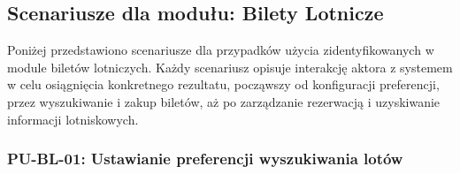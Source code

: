 \documentclass[a4paper,12pt]{article}
\begin{document}
\subsection{Scenariusze dla modułu: Bilety Lotnicze}
Poniżej przedstawiono scenariusze dla przypadków użycia zidentyfikowanych w module biletów lotniczych. Każdy scenariusz opisuje interakcję aktora z systemem w celu osiągnięcia konkretnego rezultatu, począwszy od konfiguracji preferencji, przez wyszukiwanie i zakup biletów, aż po zarządzanie rezerwacją i uzyskiwanie informacji lotniskowych.

\subsubsection{PU-BL-01: Ustawianie preferencji wyszukiwania lotów}

\begingroup %
\small %
\renewcommand{\arraystretch}{1.2} %

\newlength{\pierwszakolumnaszerokoscPUBKUstPref}
\setlength{\pierwszakolumnaszerokoscPUBKUstPref}{4.0cm}

\newlength{\drugakolumnaszerokoscPUBKUstPref}
\setlength{\drugakolumnaszerokoscPUBKUstPref}{\dimexpr\textwidth-\pierwszakolumnaszerokoscPUBKUstPref-2\tabcolsep-3\arrayrulewidth\relax}
\end{document}

